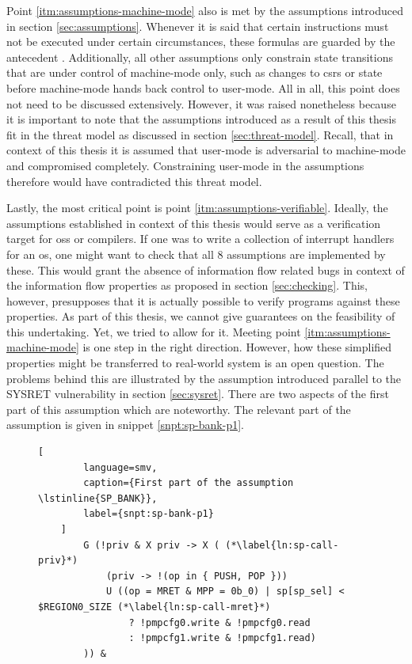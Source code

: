 Point \ref{itm:assumptions-machine-mode} also is met by the assumptions introduced in section \ref{sec:assumptions}.
Whenever it is said that certain instructions must not be executed under certain circumstances, these formulas are guarded by the antecedent .
Additionally, all other assumptions only constrain state transitions that are under control of machine-mode only, such as changes to \glspl{csr} or state before machine-mode hands back control to user-mode.
All in all, this point does not need to be discussed extensively.
However, it was raised nonetheless because it is important to note that the assumptions introduced as a result of this thesis fit in the threat model as discussed in section \ref{sec:threat-model}.
Recall, that in context of this thesis it is assumed that user-mode is adversarial to machine-mode and compromised completely.
Constraining user-mode in the assumptions therefore would have contradicted this threat model.

Lastly, the most critical point is point \ref{itm:assumptions-verifiable}.
Ideally, the assumptions established in context of this thesis would serve as a verification target for \glspl{os} or compilers.
If one was to write a collection of interrupt handlers for an \gls{os}, one might want to check that all 8 assumptions are implemented by these.
This would grant the absence of information flow related bugs in context of the information flow properties as proposed in section \ref{sec:checking}.
This, however, presupposes that it is actually possible to verify programs against these properties.
As part of this thesis, we cannot give guarantees on the feasibility of this undertaking.
Yet, we tried to allow for it.
Meeting point \ref{itm:assumptions-machine-mode} is one step in the right direction.
However, how these simplified properties might be transferred to real-world system is an open question.
The problems behind this are illustrated by the  assumption introduced parallel to the SYSRET vulnerability in section \ref{sec:sysret}.
There are two aspects of the first part of this assumption which are noteworthy.
The relevant part of the  assumption is given in snippet \ref{snpt:sp-bank-p1}.

\begin{figure}
    \begin{lstlisting}[
        language=smv,
        caption={First part of the assumption \lstinline{SP_BANK}},
        label={snpt:sp-bank-p1}
    ]
        G (!priv & X priv -> X ( (*\label{ln:sp-call-priv}*)
            (priv -> !(op in { PUSH, POP }))
            U ((op = MRET & MPP = 0b_0) | sp[sp_sel] < $REGION0_SIZE (*\label{ln:sp-call-mret}*)
                ? !pmpcfg0.write & !pmpcfg0.read
                : !pmpcfg1.write & !pmpcfg1.read)
        )) &
    \end{lstlisting}
\end{figure}

